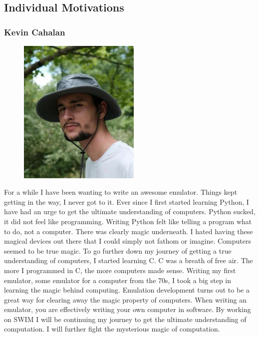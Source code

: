 \documentclass[
    paper=letter,
    parskip=half,
    fontsize=12pt,
    titlepage=firstiscover,
    toc=bibliography,
    numbers=endperiod
]{scrartcl}
\begin{document}
\subsection{Individual Motivations}
\subsubsection{Kevin Cahalan}
\begin{figure}[H]
    \includegraphics[height=7cm]{profile-kevin}
\end{figure}

For a while I have been wanting to write an awesome emulator. Things
kept getting in the way, I never got to it. Ever since I first started
learning Python, I have had an urge to get the ultimate understanding of
computers. Python sucked, it did not feel like programming. Writing
Python felt like telling a program what to do, not a computer. There was
clearly magic underneath. I hated having these magical devices out there
that I could simply not fathom or imagine. Computers seemed to be true
magic. To go further down my journey of getting a true understanding of
computers, I started learning C. C was a breath of free air. The more I
programmed in C, the more computers made sense. Writing my first
emulator, some emulator for a computer from the 70s, I took a big step
in learning the magic behind computing. Emulation development turns out
to be a great way for clearing away the magic property of computers.
When writing an emulator, you are effectively writing your own computer
in software. By working on SWIM I will be continuing my journey to get
the ultimate understanding of computation. I will further fight the
mysterious magic of computation.
\end{document}
